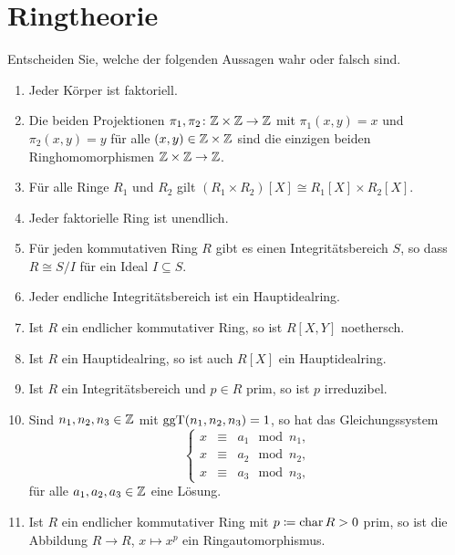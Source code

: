 \section{Ringtheorie}




\begin{question}[subtitle = Multiple Choice]
  Entscheiden Sie, welche der folgenden Aussagen wahr oder falsch sind.
  \begin{enumerate}
    \item
      Jeder Körper ist faktoriell.
    \item
      Die beiden Projektionen $\pi_1, \pi_2 \colon \mathbb{Z} \times \mathbb{Z} \to \mathbb{Z}$ mit $\pi_1(x,y) = x$ und $\pi_2(x,y) = y$ für alle $(x,y) \in \mathbb{Z} \times \mathbb{Z}$ sind die einzigen beiden Ringhomomorphismen $\mathbb{Z} \times \mathbb{Z} \to \mathbb{Z}$.
    \item
      Für alle Ringe $R_1$ und $R_2$ gilt $(R_1 \times R_2)[X] \cong R_1[X] \times R_2[X]$.
    \item
      Jeder faktorielle Ring ist unendlich.
    \item
      Für jeden kommutativen Ring $R$ gibt es einen Integritätsbereich $S$, so dass $R \cong S/I$ für ein Ideal $I \subseteq S$.
    \item
      Jeder endliche Integritätsbereich ist ein Hauptidealring.
    \item
      Ist $R$ ein endlicher kommutativer Ring, so ist $R[X,Y]$ noethersch.
    \item
      Ist $R$ ein Hauptidealring, so ist auch $R[X]$ ein Hauptidealring.
    \item
      Ist $R$ ein Integritätsbereich und $p \in R$ prim, so ist $p$ irreduzibel.
    \item
      Sind $n_1, n_2, n_3 \in \mathbb{Z}$ mit $\operatorname{ggT}(n_1, n_2, n_3) = 1$, so hat das Gleichungssystem
      \[
        \left\{
          \begin{array}{ccc}
            x &\equiv&  a_1 \mod n_1,
            \\
            x &\equiv&  a_2 \mod n_2,
            \\
            x &\equiv&  a_3 \mod n_3,
          \end{array}
        \right.
      \]
      für alle $a_1, a_2, a_3 \in \mathbb{Z}$ eine Lösung.
    \item
      Ist $R$ ein endlicher kommutativer Ring mit $p \coloneqq \operatorname{char} R > 0$ prim, so ist die Abbildung $R \to R$, $x \mapsto x^p$ ein Ringautomorphismus.
  \end{enumerate}
\end{question}


